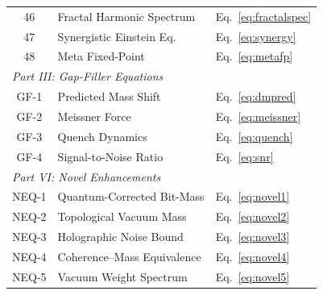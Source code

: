 \documentclass[11pt,a4paper]{article}
\theoremstyle{remark}
\begin{document}
\begin{longtable}{@{}c l l@{}}
46 & Fractal Harmonic Spectrum & Eq.~\eqref{eq:fractalspec} \\
47 & Synergistic Einstein Eq. & Eq.~\eqref{eq:synergy} \\
48 & Meta Fixed-Point & Eq.~\eqref{eq:metafp} \\
\midrule
\multicolumn{3}{l}{\textit{Part III: Gap-Filler Equations}} \\
GF-1 & Predicted Mass Shift & Eq.~\eqref{eq:dmpred} \\
GF-2 & Meissner Force & Eq.~\eqref{eq:meissner} \\
GF-3 & Quench Dynamics & Eq.~\eqref{eq:quench} \\
GF-4 & Signal-to-Noise Ratio & Eq.~\eqref{eq:snr} \\
\midrule
\multicolumn{3}{l}{\textit{Part VI: Novel Enhancements}} \\
NEQ-1 & Quantum-Corrected Bit-Mass & Eq.~\eqref{eq:novel1} \\
NEQ-2 & Topological Vacuum Mass & Eq.~\eqref{eq:novel2} \\
NEQ-3 & Holographic Noise Bound & Eq.~\eqref{eq:novel3} \\
NEQ-4 & Coherence--Mass Equivalence & Eq.~\eqref{eq:novel4} \\
NEQ-5 & Vacuum Weight Spectrum & Eq.~\eqref{eq:novel5} \\
\end{longtable}

\end{document}
